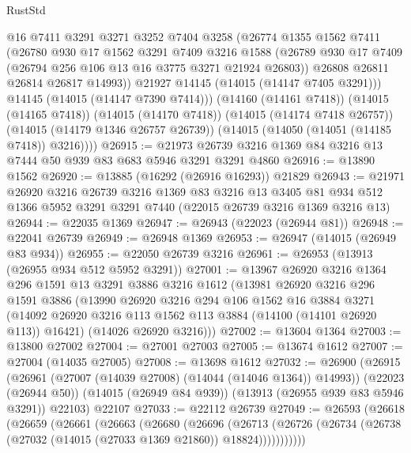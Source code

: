 \begin{lexlean}{RustStd}
\begin{coremodule}
            @16
            @7411
            @3291
            @3271
            @3252
            @7404
            @3258
            (@26774
              @1355
              @1562
              @7411
              (@26780
                @930
                @17
                @1562
                @3291
                @7409
                @3216
                @1588
                (@26789 @930 @17 @7409 (@26794 @256 @106 @13 @16 @3775 @3271 @21924 @26803))
                @26808
                @26811
                @26814
                @26817
                @14993))
            @21927
            @14145
            (@14015 (@14147 @7405 @3291)))
          @14145
          (@14015 (@14147 @7390 @7414)))
        (@14160 (@14161 @7418))
        (@14015 (@14165 @7418))
        (@14015 (@14170 @7418))
        (@14015 (@14174 @7418 @26757))
        (@14015 (@14179 @1346 @26757 @26739))
        (@14015 (@14050 (@14051 (@14185 @7418)) @3216))))
@26915 := @21973 @26739 @3216 @1369 @84 @3216 @13 @7444 @50 @939 @83 @683 @5946 @3291 @3291 @4860
@26916 := @13890 @1562
@26920 := @13885 (@16292 (@26916 @16293)) @21829
@26943 := @21971
    @26920
    @3216
    @26739
    @3216
    @1369
    @83
    @3216
    @13
    @3405
    @81
    @934
    @512
    @1366
    @5952
    @3291
    @3291
    @7440
    (@22015 @26739 @3216 @1369 @3216 @13)
@26944 := @22035 @1369
@26947 := @26943 (@22023 (@26944 @81))
@26948 := @22041 @26739
@26949 := @26948 @1369
@26953 := @26947 (@14015 (@26949 @83 @934))
@26955 := @22050 @26739 @3216
@26961 := @26953 (@13913 (@26955 @934 @512 @5952 @3291))
@27001 := @13967
    @26920
    @3216
    @1364
    @296
    @1591
    @13
    @3291
    @3886
    @3216
    @1612
    (@13981
      @26920
      @3216
      @296
      @1591
      @3886
      (@13990
        @26920
        @3216
        @294
        @106
        @1562
        @16
        @3884
        @3271
        (@14092 @26920 @3216 @113 @1562 @113 @3884 (@14100 (@14101 @26920 @113)) @16421)
        (@14026 @26920 @3216)))
@27002 := @13604 @1364
@27003 := @13800 @27002
@27004 := @27001 @27003
@27005 := @13674 @1612
@27007 := @27004 (@14035 @27005)
@27008 := @13698 @1612
@27032 := @26900
    (@26915
      (@26961 (@27007 (@14039 @27008) (@14044 (@14046 @1364)) @14993))
      (@22023 (@26944 @50))
      (@14015 (@26949 @84 @939))
      (@13913 (@26955 @939 @83 @5946 @3291))
      @22103)
    @22107
@27033 := @22112 @26739
@27049 := @26593
    (@26618
      (@26659
        (@26661
          (@26663
            (@26680
              (@26696
                (@26713
                  (@26726 (@26734 (@26738 (@27032 (@14015 (@27033 @1369 @21860)) @18824)))))))))))

\end{coremodule}
\end{lexlean}
